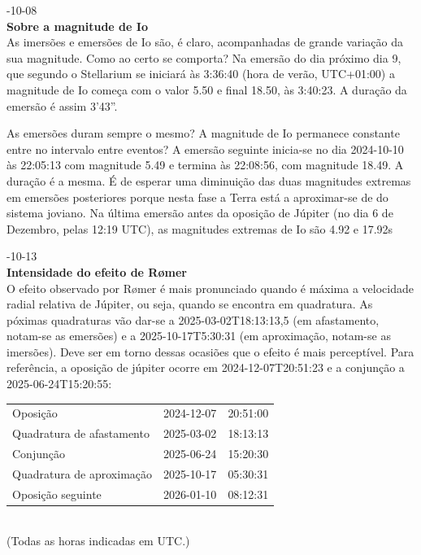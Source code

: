 \documentclass[]{article}
\newcommand{\newlog}[2]{%
  \par
  \vspace{\baselineskip}
  \noindent
  #1\\
  \textbf{#2}\\
}
\begin{document}
\newlog{2024-10-08}{Sobre a magnitude de Io}
As imersões e emersões de Io são, é claro, acompanhadas de grande variação da
sua magnitude. Como ao certo se comporta?
Na emersão do dia próximo dia 9, que segundo o Stellarium se iniciará às 3:36:40
(hora de verão, UTC+01:00) a magnitude de Io começa com o valor 5.50 e final
18.50, às 3:40:23. A duração da emersão é assim 3'43''.

As emersões duram sempre o mesmo? A magnitude de Io permanece constante entre
no intervalo entre eventos? A emersão seguinte inicia-se no dia 2024-10-10 às
22:05:13 com magnitude 5.49 e termina às 22:08:56, com magnitude 18.49. A
duração é a mesma. É de esperar uma diminuição das duas magnitudes extremas em
emersões posteriores porque nesta fase a Terra está a aproximar-se de do sistema
joviano. Na última emersão antes da oposição de Júpiter (no dia 6 de Dezembro,
pelas 12:19 UTC), as magnitudes extremas de Io são 4.92 e 17.92s

\newlog{2024-10-13}{Intensidade do efeito de R{\o}mer}
O efeito observado por R{\o}mer é mais pronunciado quando é máxima a velocidade
radial relativa de Júpiter, ou seja, quando se encontra em quadratura. As
póximas quadraturas vão dar-se a 2025-03-02T18:13:13,5 (em afastamento, notam-se
as emersões) e a 2025-10-17T5:30:31 (em aproximação, notam-se as
imersões). Deve ser em torno dessas ocasiões que o efeito é mais perceptível.
Para referência, a oposição de júpiter ocorre em 2024-12-07T20:51:23 e a
conjunção a 2025-06-24T15:20:55:
\begin{center}
  \begin{minipage}{0.65\linewidth}
  \begin{tabular}{lcc}
    \hline
    Oposição                  & 2024-12-07 & 20:51:00\\
    Quadratura de afastamento & 2025-03-02 & 18:13:13\\
    Conjunção                 & 2025-06-24 & 15:20:30\\
    Quadratura de aproximação & 2025-10-17 & 05:30:31\\
    Oposição seguinte         & 2026-01-10 & 08:12:31\\
    \hline
  \end{tabular}\\
{\sf\small (Todas as horas indicadas em UTC.)}
  \end{minipage}
  \hspace{1em}
  \\
\end{center}
\end{document}
